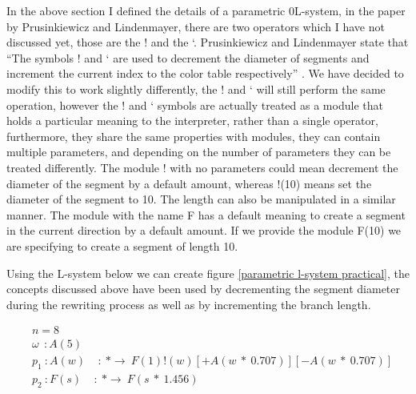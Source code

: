 \begin{flushleft}


In the above section I defined the details of a parametric 0L-system, in the paper by Prusinkiewicz and Lindenmayer, there are two operators which I have not discussed yet, those are the ! and the ‘. Prusinkiewicz and Lindenmayer state that “The symbols ! and ‘ are used to decrement the diameter of segments and increment the current index to the color table respectively” \cite{prusinkiewicz2012algorithmic}. We have decided to modify this to work slightly differently, the ! and ‘ will still perform the same operation, however the ! and ‘ symbols are actually treated as a module that holds a particular meaning to the interpreter, rather than a single operator, furthermore, they share the same properties with modules, they can contain multiple parameters, and depending on the number of parameters they can be treated differently. The module ! with no parameters could mean decrement the diameter of the segment by a default amount, whereas !(10) means set the diameter of the segment to 10. The length can also be manipulated in a similar manner. The module with the name F has a default meaning to create a segment in the current direction by a default amount. If we provide the module F(10) we are specifying to create a segment of length 10.\\

\vspace{5mm}

Using the L-system below we can create figure \ref{parametric l-system practical}, the concepts discussed above have been used by decrementing the segment diameter during the rewriting process as well as by incrementing the branch length.

\vspace{5mm}

\begin{equation} \label{parametric l-system practical}
\begin{aligned}
	&n=8 \\
	&\omega~~ : A(5)\\
	&p_1~ :  A(w)~~~~~ :~ * \rightarrow~ F(1)!(w)[+A(w~*~0.707)][-A(w~*~0.707)]\\
	&p_2~ :  F(s)~~~~~ :~ * \rightarrow~ F(s~*~1.456)\\
\end{aligned}
\end{equation}

\vspace{5mm}


\end{flushleft}
